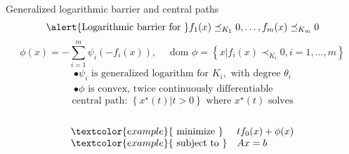 \documentclass{beamer}
\begin{document}
\begin{frame}[noframenumbering]{Generalized logarithmic barrier and central paths}
	\begin{equation*}
	\alert{\text {Logarithmic barrier for }} f_{1}(x) \preceq_{K_{1}} 0, \ldots, f_{m}(x) \preceq_{K_{m}} 0
	\end{equation*}
	\begin{equation*}
	\phi(x)=-\sum_{i=1}^{m} \psi_{i}\left(-f_{i}(x)\right), \quad \text { dom } \phi=\left\{x | f_{i}(x) \prec_{K_{i}} 0, i=1, \ldots, m\right\}
	\end{equation*}
	\begin{equation*}
	\begin{array}{l}{\bullet \psi_{i} \text { is generalized logarithm for } K_{i}, \text { with degree } \theta_{i}} \\ {\bullet \phi \text { is convex, twice continuously differentiable }}\end{array}
	\end{equation*}
	\begin{equation*}
	\text { central path: }\left\{x^{\star}(t) | t>0\right\} \text { where } x^{\star}(t) \text { solves }
	\end{equation*}\\[0.2cm]
	\begin{equation*}
	\begin{array}{ll} \textcolor{example}{\text { minimize }} & {t f_{0}(x)+\phi(x)} \\ \textcolor{example}{\text { subject to }} & {A x=b}\end{array}
	\end{equation*}
	
\end{frame}



%
\end{document}
